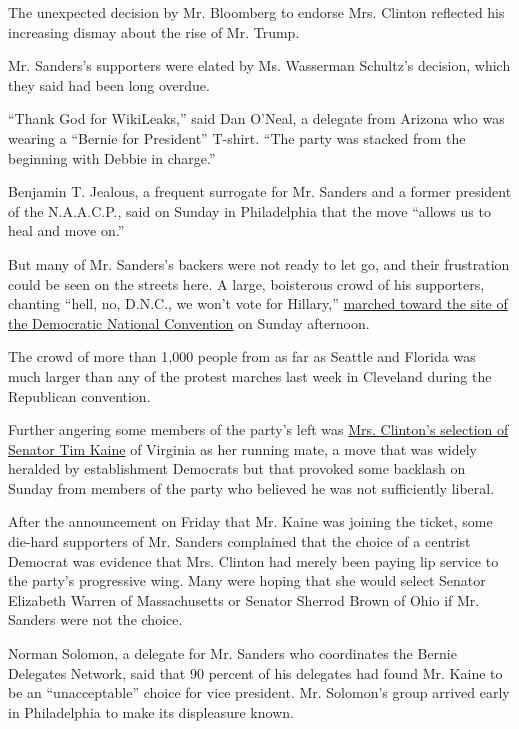 The unexpected decision by Mr. Bloomberg to endorse Mrs. Clinton
reflected his increasing dismay about the rise of Mr. Trump.

Mr. Sanders's supporters were elated by Ms. Wasserman Schultz's
decision, which they said had been long overdue.

``Thank God for WikiLeaks,'' said Dan O'Neal, a delegate from Arizona
who was wearing a ``Bernie for President'' T-shirt. ``The party was
stacked from the beginning with Debbie in charge.''

Benjamin T. Jealous, a frequent surrogate for Mr. Sanders and a former
president of the N.A.A.C.P., said on Sunday in Philadelphia that the
move ``allows us to heal and move on.''

But many of Mr. Sanders's backers were not ready to let go, and their
frustration could be seen on the streets here. A large, boisterous crowd
of his supporters, chanting ``hell, no, D.N.C., we won't vote for
Hillary,''
\href{http://www.nytimes3xbfgragh.onion/2016/07/25/us/politics/protests-convention-bernie-sanders-philadelphia.html}{marched
toward the site of the Democratic National Convention} on Sunday
afternoon.

The crowd of more than 1,000 people from as far as Seattle and Florida
was much larger than any of the protest marches last week in Cleveland
during the Republican convention.

Further angering some members of the party's left was
\href{http://www.nytimes3xbfgragh.onion/2016/07/23/us/politics/tim-kaine-hillary-clinton-vice-president.html?action=click\&contentCollection=Politics\&module=RelatedCoverage\&region=Marginalia\&pgtype=article}{Mrs.
Clinton's selection of Senator Tim Kaine} of Virginia as her running
mate, a move that was widely heralded by establishment Democrats but
that provoked some backlash on Sunday from members of the party who
believed he was not sufficiently liberal.

After the announcement on Friday that Mr. Kaine was joining the ticket,
some die-hard supporters of Mr. Sanders complained that the choice of a
centrist Democrat was evidence that Mrs. Clinton had merely been paying
lip service to the party's progressive wing. Many were hoping that she
would select Senator Elizabeth Warren of Massachusetts or Senator
Sherrod Brown of Ohio if Mr. Sanders were not the choice.

Norman Solomon, a delegate for Mr. Sanders who coordinates the Bernie
Delegates Network, said that 90 percent of his delegates had found Mr.
Kaine to be an ``unacceptable'' choice for vice president. Mr. Solomon's
group arrived early in Philadelphia to make its displeasure known.

